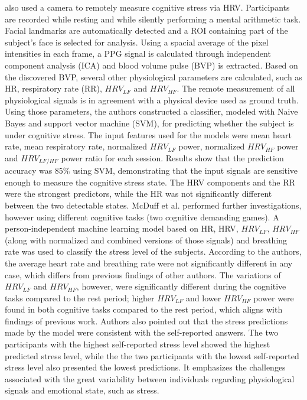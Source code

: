 \textcite{mcduff2014remote} also used a camera to remotely measure cognitive stress via HRV. Participants are recorded while resting and while silently performing a mental arithmetic task. Facial landmarks are automatically detected and a ROI containing part of the subject's face is selected for analysis. Using a spacial average of the pixel intensities in each frame, a PPG signal is calculated through independent component analysis (ICA) and blood volume pulse (BVP) is extracted. Based on the discovered BVP, several other physiological parameters are calculated, such as HR, respiratory rate (RR), $HRV_{LF}$ and $HRV_{HF}$. The remote measurement of all physiological signals is in agreement with a physical device used as ground truth. Using those parameters, the authors constructed a classifier, modeled with Naive Bayes and support vector machine (SVM), for predicting whether the subject is under cognitive stress. The input features used for the models were mean heart rate, mean respiratory rate, normalized $HRV_{LF}$ power, normalized $HRV_{HF}$ power and $HRV_{LF/HF}$ power ratio for each session. Results show that the prediction accuracy was 85\% using SVM, demonstrating that the input signals are sensitive enough to measure the cognitive stress state. The HRV components and the RR were the strongest predictors, while the HR was not significantly different between the two detectable states. McDuff et al. \parencite{mcduffcogcam} performed further investigations, however using different cognitive tasks (two cognitive demanding games). A person-independent machine learning model based on HR, HRV, $HRV_{LF}$, $HRV_{HF}$ (along with normalized and combined versions of those signals) and breathing rate was used to classify the stress level of the subjects. According to the authors, the average heart rate and breathing rate were not significantly different in any case, which differs from previous findings of other authors. The variations of $HRV_{LF}$ and $HRV_{HF}$, however, were significantly different during the cognitive tasks compared to the rest period; higher $HRV_{LF}$ and lower $HRV_{HF}$ power were found in both cognitive tasks compared to the rest period, which aligns with findings of previous work. Authors also pointed out that the stress predictions made by the model were consistent with the self-reported answers. The two participants with the highest self-reported stress level showed the highest predicted stress level, while the the two participants with the lowest self-reported stress level also presented the lowest predictions. It emphasizes the challenges associated with the great variability between individuals regarding physiological signals and emotional state, such as stress.
